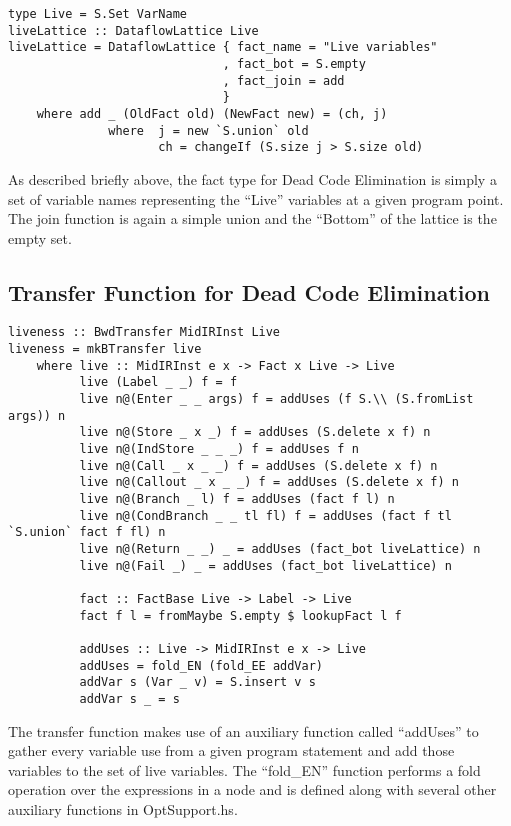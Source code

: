 \documentclass[11pt]{article}
\begin{document}
\begin{verbatim}
type Live = S.Set VarName 
liveLattice :: DataflowLattice Live 
liveLattice = DataflowLattice { fact_name = "Live variables"
                              , fact_bot = S.empty 
                              , fact_join = add
                              } 
    where add _ (OldFact old) (NewFact new) = (ch, j)
              where  j = new `S.union` old
                     ch = changeIf (S.size j > S.size old) 
\end{verbatim}

As described briefly above, the fact type for Dead Code Elimination is simply a set of variable names representing the ``Live'' variables at a given program point. The join function is again a simple union and the ``Bottom'' of the lattice is the empty set. 

\subsection { Transfer Function for Dead Code Elimination}

\begin{verbatim}
liveness :: BwdTransfer MidIRInst Live 
liveness = mkBTransfer live 
    where live :: MidIRInst e x -> Fact x Live -> Live
          live (Label _ _) f = f 
          live n@(Enter _ _ args) f = addUses (f S.\\ (S.fromList args)) n
          live n@(Store _ x _) f = addUses (S.delete x f) n 
          live n@(IndStore _ _ _) f = addUses f n 
          live n@(Call _ x _ _) f = addUses (S.delete x f) n
          live n@(Callout _ x _ _) f = addUses (S.delete x f) n 
          live n@(Branch _ l) f = addUses (fact f l) n 
          live n@(CondBranch _ _ tl fl) f = addUses (fact f tl `S.union` fact f fl) n 
          live n@(Return _ _) _ = addUses (fact_bot liveLattice) n 
          live n@(Fail _) _ = addUses (fact_bot liveLattice) n 

          fact :: FactBase Live -> Label -> Live 
          fact f l = fromMaybe S.empty $ lookupFact l f 

          addUses :: Live -> MidIRInst e x -> Live 
          addUses = fold_EN (fold_EE addVar) 
          addVar s (Var _ v) = S.insert v s 
          addVar s _ = s
\end{verbatim}

The transfer function makes use of an auxiliary function called ``addUses'' to gather every variable use from a given program statement and add those variables to the set of live variables. The ``fold\_EN'' function performs a fold operation over the expressions in a node and is defined along with several other auxiliary functions in OptSupport.hs. 
 
\end{document}
